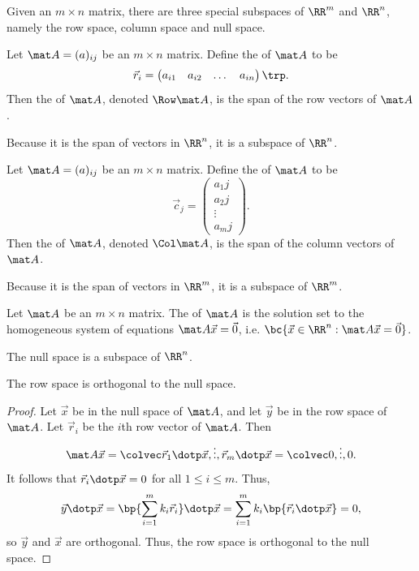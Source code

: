 Given an $m \times n$ matrix, there are three special subspaces of $\RR^m$ and $\RR^n$, namely the row space, column space and null space.

\begin{definition}
    Let $\mat A = (a)_{ij}$ be an $m \times n$ matrix. Define the  of $\mat A$ to be \[\vec r_i = \begin{pmatrix}a_{i1} & a_{i2} & \dots & a_{in}\end{pmatrix}\trp.\] Then the  of $\mat A$, denoted $\Row \mat A$, is the span of the row vectors of $\mat A$.
\end{definition}

Because it is the span of vectors in $\RR^n$, it is a subspace of $\RR^n$.

\begin{definition}
    Let $\mat A = (a)_{ij}$ be an $m \times n$ matrix. Define the  of $\mat A$ to be \[\vec c_j = \begin{pmatrix}a_1j \\ a_2j \\ \vdots \\ a_mj \end{pmatrix}.\] Then the  of $\mat A$, denoted $\Col \mat A$, is the span of the column vectors of $\mat A$.
\end{definition}

Because it is the span of vectors in $\RR^m$, it is a subspace of $\RR^m$.

\begin{definition}
    Let $\mat A$ be an $m \times n$ matrix. The  of $\mat A$ is the solution set to the homogeneous system of equations $\mat A \vec x = \vec 0$, i.e. $\bc{\vec x \in \RR^n : \mat A \vec x = \vec 0}$.
\end{definition}

The null space is a subspace of $\RR^n$.

\begin{proposition}
    The row space is orthogonal to the null space.
\end{proposition}
\begin{proof}
    Let $\vec x$ be in the null space of $\mat A$, and let $\vec y$ be in the row space of $\mat A$. Let $\vec r_i$ be the $i$th row vector of $\mat A$. Then \[\mat A \vec x = \cveciii{\vec r_1 \dotp \vec x}{\vdots}{\vec r_m \dotp \vec x} = \cveciii0{\vdots}0.\] It follows that $\vec r_i \dotp \vec x = 0$ for all $1 \leq i \leq m$. Thus, \[\vec y \dotp \vec x = \bp{\sum_{i = 1}^m k_i \vec r_i} \dotp \vec x = \sum_{i = 1}^m k_i \bp{\vec r_i \dotp \vec x} = 0,\] so $\vec y$ and $\vec x$ are orthogonal. Thus, the row space is orthogonal to the null space.
\end{proof}

